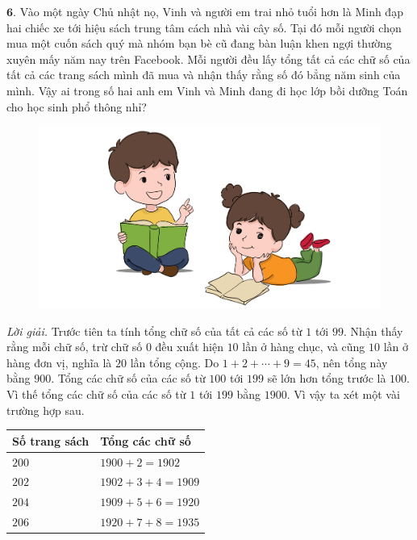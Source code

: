 \begin{multicols}{2}
	\vskip 0.1cm
	$\pmb{6.}$ Vào một ngày Chủ nhật nọ, Vinh và người em trai nhỏ tuổi hơn là Minh  đạp hai chiếc xe tới hiệu sách trung tâm cách nhà vài cây số. Tại đó mỗi người chọn mua một cuốn sách quý mà nhóm bạn bè cũ đang bàn luận khen ngợi thường xuyên mấy năm nay trên Facebook. Mỗi người đều lấy tổng tất cả các chữ số của tất cả các trang sách mình đã mua và nhận thấy rằng số đó bẳng năm sinh của mình. Vậy ai  trong số hai anh em Vinh và Minh  đang đi học lớp  bồi dưỡng Toán cho học sinh phổ thông nhỉ?
	\begin{figure}[H]
		\centering
		\vspace*{-5pt}
		\captionsetup{labelformat= empty, justification=centering}
		\includegraphics[width=0.8\linewidth]{Pi1_2_Bai6}
		\vspace*{-10pt}
	\end{figure}
	\textit{Lời giải.} 	Trước tiên ta tính tổng chữ số của tất cả các số từ $1$ tới $99$. Nhận thấy rằng mỗi chữ số, trừ chữ số $0$ đều xuất hiện $10$ lần ở hàng chục, và cũng $10$ lần ở hàng đơn vị, nghĩa là $20$ lần tổng cộng. Do $1+2+ \cdots+9=45$, nên tổng này bằng  $900$. Tổng các chữ số của các số từ $100$ tới $199$ sẽ lớn hơn tổng trước là $100$. Vì thế tổng các chữ số của các số từ $1$ tới $199$ bằng $1900$. Vì vậy ta xét một vài trường hợp sau.
	\begin{table}[H]
		\centering
		\vspace*{-5pt}
		\captionsetup{labelformat= empty, justification=centering}
		\renewcommand{\arraystretch}{1.05}
		\begin{tabular}{|l|l|}
			\hline
			\textbf{Số trang sách}&	\textbf{Tổng các chữ số}\\
			\hline
			$200$&	$1900+2 =1902$\\
			\hline
			$202$&	$1902+3+4=1909$\\
			\hline
			$204$&	$1909+5+6=1920$\\
			\hline
			$206$&	$1920+7+8=1935$\\
			\hline

\end{tabular}
\end{table}
\end{multicols}
